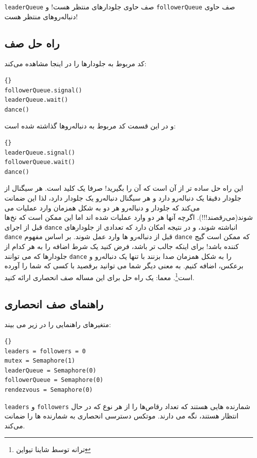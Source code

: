 \documentclass{book}
\newcommand{\clearemptydoublepage}{\newpage\cleardoublepage}
\begin{document}
{\tt leaderQueue} صف حاوی جلو‌دارهای منتظر هست!
و
 {\tt followerQueue} صف حاوی دنباله‌رو‌های منتظر هست!



\clearemptydoublepage
\subsection {راه حل صف}

کد مربوط به جلو‌دارها را در اینجا مشاهده می‌کند:

\begin{lstlisting}[title={Queue solution (leaders)}]{}
followerQueue.signal()
leaderQueue.wait()
dance()
\end{lstlisting}

و در این قسمت کد مربوط به دنباله‌روها گذاشته شده است:

\begin{lstlisting}[title={Queue solution (followers)}]{}
leaderQueue.signal()
followerQueue.wait()
dance()
\end{lstlisting}
این راه حل ساده تر از آن است که آن را بگیرید! صرفا یک کلید است. هر سیگنال از جلودار دقیقا یک دنباله‌رو دارد و هر سیگنال دنباله‌رو یک جلو‌دار دارد، لذا این ضمانت می‌کند که جلو‌دار و دنباله‌رو هر دو به شکل همزمان وارد عملیات می شوند(می‌رقصند!!!). اگرچه  آنها هر دو وارد عملیات شده اند اما این ممکن است که نخ‌ها قبل از اجرای {\tt dance} انباشته شوند، و در نتیجه امکان دارد که تعدادی از جلو‌دارهای {\tt dance} قبل از دنباله‌رو ها وارد عمل شوند. بر اساس مفهوم {\tt dance} که ممکن است گیج کننده باشد!
برای اینکه جالب تر باشد، فرض کنید یک شرط اضافه را به هر کدام از جلودار‌ها که می توانند {\tt dance} را به شکل همزمان صدا بزنند با تنها یک دنباله‌رو و برعکس، اضافه کنیم. به معنی دیگر شما می توانید برقصید با کسی که شما را آورده است\footnote{ترانه توسط شاینا تیواین}.
معما: یک راه حل برای این مساله صف انحصاری ارائه کنید.

\clearemptydoublepage
\subsection {راهنمای صف انحصاری}

متغیرهای راهنمایی را در زیر می بیند:

\begin{lstlisting}[title={Queue hint}]{}
leaders = followers = 0
mutex = Semaphore(1)
leaderQueue = Semaphore(0)
followerQueue = Semaphore(0)
rendezvous = Semaphore(0)
\end{lstlisting}

{\tt leaders} و {\tt followers} 
شمارنده هایی هستند که تعداد رقاص‌ها را از هر نوع که در حال انتظار هستند، نگه می دارند. موتکس دسترسی انحصاری به شمارنده ها را ضمانت می‌کند.
\end{document}
